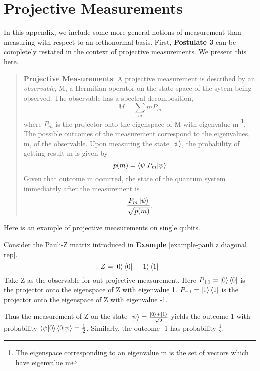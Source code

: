 
\chapter{Projective Measurements} %

\label{AppendixA} %
In this appendix, we include some more general notions of measurement than measuring with respect to an orthonormal basis.  First, {\bf{Postulate 3}} can be completely restated in the context of projective measurements.  We present this here.
\begin{quote}
    \textbf{Projective Measurements}: A projective measurement is described by an \textit{observable}, M, a Hermitian operator on the state space of the sytem being observed. The observable has a spectral decomposition,
    \begin{equation}
        M=\sum_m m P_m
    \end{equation}
    where $P_m$ is the projector onto the eigenspace of M with eigenvalue m \footnote{The eigenspace corresponding to an eigenvalue m is the set of vectors which have eigenvalue m}. The possible outcomes of the measurement correspond to the eigenvalues, m, of the observable. Upon measuring the state $\ket{\psi}$, the probability of getting result m is given by 
    \begin{equation} \label{eqn: projective measurement}
        p(m)=\braket{\psi|P_m|\psi}
    \end{equation}
    Given that outcome m occurred, the state of the quantum system immediately after the measurement is 
    \begin{equation}
        \frac{P_m \ket{\psi}}{\sqrt{p(m)}}.
    \end{equation}
\end{quote}

Here is an example of projective measurements on single qubits.
\begin{example}
Consider the Pauli-Z matrix introduced in \textbf{Example} \ref{example-pauli z diagonal rep}.
\begin{equation}
    Z=\ket{0}\bra{0}-\ket{1}\bra{1}
\end{equation}
Take Z as the observable for out projective measurement. Here $P_{+1}=\ket{0}\bra{0}$ is the projector onto the eigenspace of Z with eigenvalue 1. $P_{-1}=\ket{1}\bra{1}$ is the projector onto the eigenspace of Z with eigenvalue -1.

Thus the measurement of Z on the state $\ket{\psi}=\frac{\ket{0}+\ket{1}}{\sqrt{2}}$ yields the outcome 1 with probability $\braket{\psi|0}\braket{0|\psi}=\frac{1}{2}$. Similarly, the outcome -1 has probability $\frac{1}{2}$.
\end{example}

